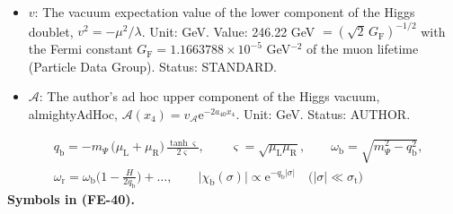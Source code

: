 \documentclass[
  10pt,
]{article}
\begin{document}
\begin{itemize}
  \(\langle J_f^\mu\rangle\) in the rest frame of the medium. Unit:
  GeV\(^3\). Status: STANDARD.
\item
  \(v\): The vacuum expectation value of the lower component of the
  Higgs doublet, \(v^2 = -\mu^2/\lambda\). Unit: GeV. Value: 246.22 GeV
  \(= (\sqrt2\,G_{\mathrm{F}})^{-1/2}\) with the Fermi constant
  \(G_{\mathrm{F}} = 1.1663788\times10^{-5}\) GeV\(^{-2}\) of the muon
  lifetime (Particle Data Group). Status: STANDARD.
\item
  \(\mathcal{A}\): The author's ad hoc upper component of the Higgs
  vacuum, almightyAdHoc,
  \(\mathcal{A}(x_4) = v_{\mathcal{A}}\mathrm{e}^{-2a_{40}x_4}\). Unit:
  GeV. Status: AUTHOR.
\end{itemize}

\[
\begin{aligned}
&q_{\mathrm{b}} = -m_\Psi\,\big(\mu_{\mathrm{L}} + \mu_{\mathrm{R}}\big)\,\frac{\tanh\varsigma}{2\varsigma},\qquad \varsigma = \sqrt{\mu_{\mathrm{L}}\mu_{\mathrm{R}}},\qquad
\omega_{\mathrm{b}} = \sqrt{m_\Psi^2 - q_{\mathrm{b}}^2},\\
&\omega_{\mathrm{r}} = \omega_{\mathrm{b}}\Big(1 - \frac{H}{2q_{\mathrm{b}}}\Big) + \dots,\qquad
\lvert\chi_{\mathrm{b}}(\sigma)\rvert \propto \mathrm{e}^{-q_{\mathrm{b}}\lvert\sigma\rvert}\quad\big(\lvert\sigma\rvert \ll \sigma_{\mathrm{t}}\big)
\end{aligned} \tag{FE-40}
\] \textbf{Symbols in (FE-40).}
\end{document}
